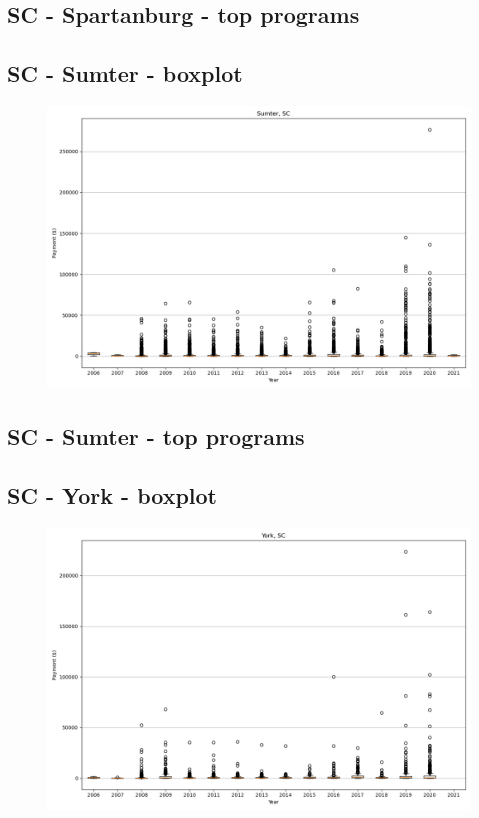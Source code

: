 \subsection*{SC - Spartanburg - top programs}

\newpage
\subsection*{SC - Sumter - boxplot}
\begin{figure}[h]
\centering
\includegraphics[width=7in]{../output/boxplots/counties/Sumter-SC_boxplot.png}
\end{figure}


\subsection*{SC - Sumter - top programs}

\newpage
\subsection*{SC - York - boxplot}
\begin{figure}[h]
\centering
\includegraphics[width=7in]{../output/boxplots/counties/York-SC_boxplot.png}
\end{figure}


